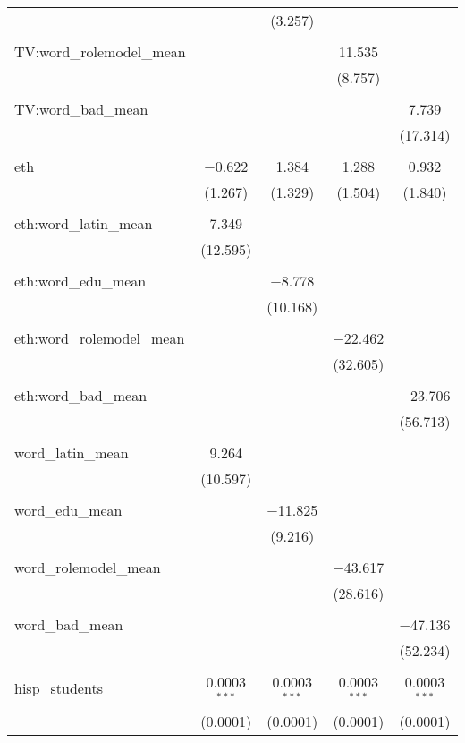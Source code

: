 \begin{table}[!htbp]
\begin{tabular}{@{\extracolsep{-2pt}}lcccc}
  &  & (3.257) &  &  \\ 
  & & & & \\ 
 TV:word\_rolemodel\_mean &  &  & 11.535 &  \\ 
  &  &  & (8.757) &  \\ 
  & & & & \\ 
 TV:word\_bad\_mean &  &  &  & 7.739 \\ 
  &  &  &  & (17.314) \\ 
  & & & & \\ 
 eth & $-$0.622 & 1.384 & 1.288 & 0.932 \\ 
  & (1.267) & (1.329) & (1.504) & (1.840) \\ 
  & & & & \\ 
 eth:word\_latin\_mean & 7.349 &  &  &  \\ 
  & (12.595) &  &  &  \\ 
  & & & & \\ 
 eth:word\_edu\_mean &  & $-$8.778 &  &  \\ 
  &  & (10.168) &  &  \\ 
  & & & & \\ 
 eth:word\_rolemodel\_mean &  &  & $-$22.462 &  \\ 
  &  &  & (32.605) &  \\ 
  & & & & \\ 
 eth:word\_bad\_mean &  &  &  & $-$23.706 \\ 
  &  &  &  & (56.713) \\ 
  & & & & \\ 
 word\_latin\_mean & 9.264 &  &  &  \\ 
  & (10.597) &  &  &  \\ 
  & & & & \\ 
 word\_edu\_mean &  & $-$11.825 &  &  \\ 
  &  & (9.216) &  &  \\ 
  & & & & \\ 
 word\_rolemodel\_mean &  &  & $-$43.617 &  \\ 
  &  &  & (28.616) &  \\ 
  & & & & \\ 
 word\_bad\_mean &  &  &  & $-$47.136 \\ 
  &  &  &  & (52.234) \\ 
  & & & & \\ 
 hisp\_students & 0.0003$^{***}$ & 0.0003$^{***}$ & 0.0003$^{***}$ & 0.0003$^{***}$ \\ 
  & (0.0001) & (0.0001) & (0.0001) & (0.0001) \\ 

\end{tabular}
\end{table}
